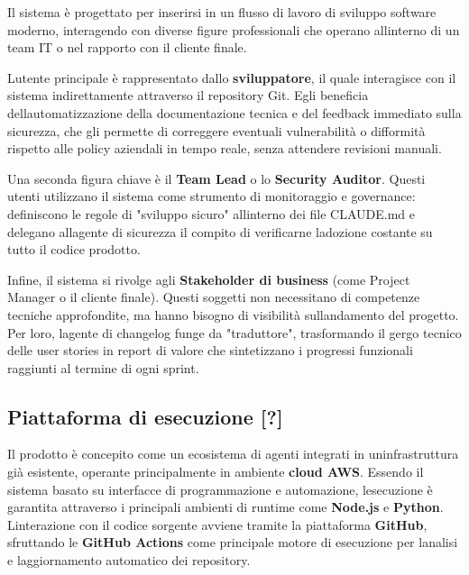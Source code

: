 \documentclass[12pt, a4paper]{article}
\begin{document}
Il sistema è progettato per inserirsi in un flusso di lavoro di sviluppo
software moderno, interagendo con diverse figure professionali che
operano all\textquotesingle interno di un team IT o nel rapporto con il
cliente finale.

L\textquotesingle utente principale è rappresentato dallo
\textbf{sviluppatore}, il quale interagisce con il sistema
indirettamente attraverso il repository Git. Egli beneficia
dell\textquotesingle automatizzazione della documentazione tecnica e del
feedback immediato sulla sicurezza, che gli permette di correggere
eventuali vulnerabilità o difformità rispetto alle policy aziendali in
tempo reale, senza attendere revisioni manuali.

Una seconda figura chiave è il \textbf{Team Lead} o lo \textbf{Security
Auditor}. Questi utenti utilizzano il sistema come strumento di
monitoraggio e governance: definiscono le regole di "sviluppo sicuro"
all\textquotesingle interno dei file CLAUDE.md e delegano
all\textquotesingle agente di sicurezza il compito di verificarne
l\textquotesingle adozione costante su tutto il codice prodotto.

Infine, il sistema si rivolge agli \textbf{Stakeholder di business}
(come Project Manager o il cliente finale). Questi soggetti non
necessitano di competenze tecniche approfondite, ma hanno bisogno di
visibilità sull\textquotesingle andamento del progetto. Per loro,
l\textquotesingle agente di changelog funge da "traduttore",
trasformando il gergo tecnico delle user stories in report di valore che
sintetizzano i progressi funzionali raggiunti al termine di ogni sprint.

\subsection{Piattaforma di esecuzione
{[}?{]}}\label{piattaforma-di-esecuzione}

Il prodotto è concepito come un ecosistema di agenti integrati in
un\textquotesingle infrastruttura già esistente, operante principalmente
in ambiente \textbf{cloud AWS}. Essendo il sistema basato su interfacce
di programmazione e automazione, l\textquotesingle esecuzione è
garantita attraverso i principali ambienti di runtime come
\textbf{Node.js} e \textbf{Python}. L\textquotesingle interazione con il
codice sorgente avviene tramite la piattaforma \textbf{GitHub},
sfruttando le \textbf{GitHub Actions} come principale motore di
esecuzione per l\textquotesingle analisi e
l\textquotesingle aggiornamento automatico dei repository.
\end{document}
